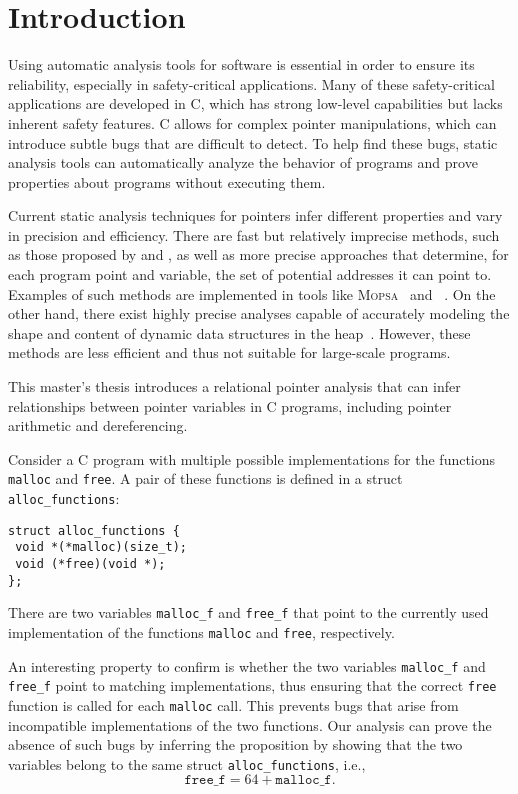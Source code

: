 
\chapter{Introduction}\label{chapter:introduction}

Using automatic analysis tools for software is essential in order to ensure its reliability, especially in safety-critical applications.
Many of these safety-critical applications are developed in C, which has strong low-level capabilities but lacks inherent safety features.
C allows for complex pointer manipulations, which can introduce subtle bugs that are difficult to detect.
To help find these bugs, static analysis tools can automatically analyze the behavior of programs and prove properties about programs without executing them.

Current static analysis techniques for pointers infer different properties and vary in precision and efficiency.
There are fast but relatively imprecise methods, such as those proposed by \textcite{Steensgaard} and \textcite{Andersen}, as well as more precise approaches that determine, for each program point and variable, the set of potential addresses it can point to.
Examples of such methods are implemented in tools like \textsc{Mopsa}~\cite{mopsa} and \goblint~\cite{goblint}.
On the other hand, there exist highly precise analyses capable of accurately modeling the shape and content of dynamic data structures in the heap~\cite{rivalpapers,kreiker,predator}.
However, these methods are less efficient and thus not suitable for large-scale programs.

This master's thesis introduces a relational pointer analysis that can infer relationships between pointer variables in C programs, including pointer arithmetic and dereferencing.
\begin{example}
    Consider a C program with multiple possible implementations for the functions \texttt{malloc} and \texttt{free}.
    A pair of these functions is defined in a struct \texttt{alloc\_functions}:
\begin{verbatim}
struct alloc_functions {
 void *(*malloc)(size_t);
 void (*free)(void *);
};
\end{verbatim}
    There are two variables \texttt{malloc\_f} and \texttt{free\_f} that point to the currently used implementation of the functions \texttt{malloc} and \texttt{free}, respectively.

    An interesting property to confirm is whether the two variables \texttt{malloc\_f} and \texttt{free\_f} point to matching implementations, thus ensuring that the correct \texttt{free} function is called for each \texttt{malloc} call.
    This prevents bugs that arise from incompatible implementations of the two functions.
    Our analysis can prove the absence of such bugs by inferring the proposition by showing that the two variables belong to the same struct \texttt{alloc\_functions}, i.e.,
    \[
        \texttt{free\_f} = 64 + \texttt{malloc\_f}.
    \]
\end{example}

